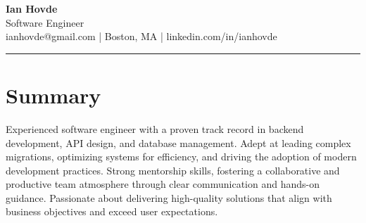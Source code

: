 \documentclass[a4paper,10pt]{article}
\begin{document}
\color{darkgray}
\vspace*{-.25in}
\pagestyle{empty}

\noindent
\hspace*{-\dimexpr\oddsidemargin+1in\relax}%
\makebox[\paperwidth]{\color{blueishgray}\rule{\paperwidth}{20pt}}

\begin{center}
    {\huge \textbf{\textcolor{blueishgray}{Ian Hovde}}} \\
    \large \textcolor{blueishgray}{Software Engineer} \\
    \normalsize \textcolor{blueishgray}{ianhovde@gmail.com | Boston, MA | linkedin.com/in/ianhovde}
\end{center}

\noindent\rule{\linewidth}{.25pt}

\section*{\textcolor{blueishgray}{Summary}}
Experienced software engineer with a proven track record in backend development, API design, and database management. 
Adept at leading complex migrations, optimizing systems for efficiency, and driving the adoption of modern development practices. 
Strong mentorship skills, fostering a collaborative and productive team atmosphere through clear communication and hands-on guidance. 
Passionate about delivering high-quality solutions that align with business objectives and exceed user expectations.
\end{document}
